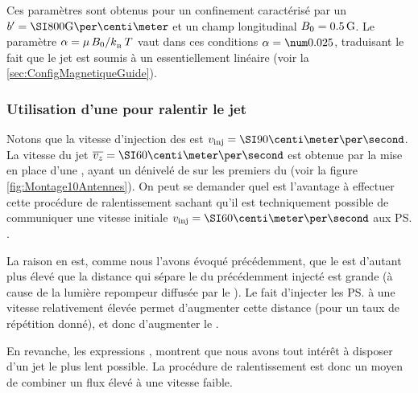 Ces paramètres sont obtenus pour un confinement caractérisé par un \gtchm $\gradB = \gausspcm{800}$ et un champ longitudinal ${B_0} = \SI{0.5}{{\rm G}}$. Le paramètre $\alpha={{\mu\,{B_0}} / {{k_{_{\rm B}}}\,T}}$ vaut dans ces conditions $\alpha = \val{0.025}$, traduisant le fait que le jet est soumis à un \ppt essentiellement linéaire (voir la \autoref{sec:ConfigMagnetiqueGuide}).
%

\casse


\subsubsection{Utilisation d'une \secpent pour ralentir le jet}
{\label{Rq:InjectionPente}
Notons que la vitesse d'injection des \pats est $\vinj = \cmps{90}$. La vitesse du jet $\vjet = \cmps{60}$ est obtenue par la mise en place d'une \secpent, ayant un dénivelé de  sur les premiers  du \gm (voir la figure \vref{fig:Montage10Antennes}).
On peut se demander quel est l'avantage à effectuer cette procédure de ralentissement sachant qu'il est techniquement possible de communiquer une vitesse initiale $\vinj = \cmps{60}$ aux \ps. 

La raison en est, comme nous l'avons évoqué précédemment, que le \fat est d'autant plus élevé que la distance qui sépare le \pmo du \p précédemment injecté est grande (à cause de la lumière repompeur diffusée par le \pmo). Le fait d'injecter les \ps à une vitesse relativement élevée permet d'augmenter cette distance (pour un taux de répétition donné), et donc d'augmenter le \fat. 

En revanche, les expressions , montrent que nous avons tout intérêt à disposer d'un jet le plus lent possible. La procédure de ralentissement est donc un moyen de combiner un flux élevé à une vitesse faible. 
}


